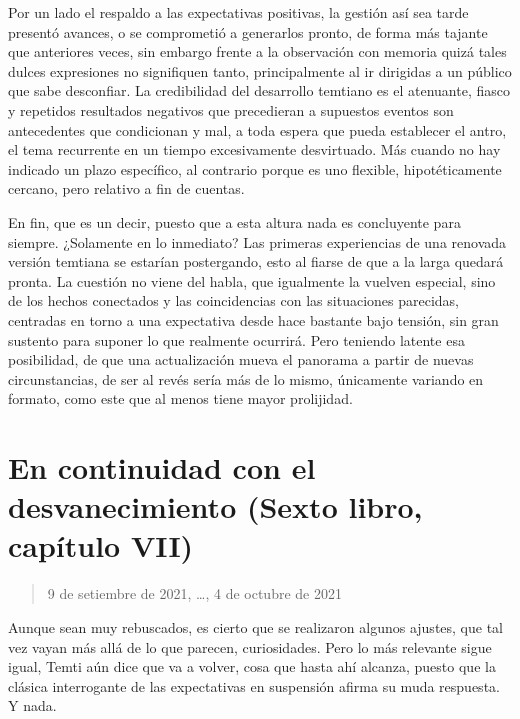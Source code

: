 \documentclass[
]{book}
\begin{document}
Por un lado el respaldo a las expectativas positivas, la gestión así sea tarde presentó avances, o se comprometió a generarlos pronto, de forma más tajante que anteriores veces, sin embargo frente a la observación con memoria quizá tales dulces expresiones no signifiquen tanto, principalmente al ir dirigidas a un público que sabe desconfiar. La credibilidad del desarrollo temtiano es el atenuante, fiasco y repetidos resultados negativos que precedieran a supuestos eventos son antecedentes que condicionan y mal, a toda espera que pueda establecer el antro, el tema recurrente en un tiempo excesivamente desvirtuado. Más cuando no hay indicado un plazo específico, al contrario porque es uno flexible, hipotéticamente cercano, pero relativo a fin de cuentas.

En fin, que es un decir, puesto que a esta altura nada es concluyente para siempre. ¿Solamente en lo inmediato? Las primeras experiencias de una renovada versión temtiana se estarían postergando, esto al fiarse de que a la larga quedará pronta. La cuestión no viene del habla, que igualmente la vuelven especial, sino de los hechos conectados y las coincidencias con las situaciones parecidas, centradas en torno a una expectativa desde hace bastante bajo tensión, sin gran sustento para suponer lo que realmente ocurrirá. Pero teniendo latente esa posibilidad, de que una actualización mueva el panorama a partir de nuevas circunstancias, de ser al revés sería más de lo mismo, únicamente variando en formato, como este que al menos tiene mayor prolijidad.

\hypertarget{en-continuidad-con-el-desvanecimiento-sexto-libro-capuxedtulo-vii}{%
\section{En continuidad con el desvanecimiento (Sexto libro, capítulo VII)}\label{en-continuidad-con-el-desvanecimiento-sexto-libro-capuxedtulo-vii}}

\begin{quote}
9 de setiembre de 2021, \ldots, 4 de octubre de 2021
\end{quote}

Aunque sean muy rebuscados, es cierto que se realizaron algunos ajustes, que tal vez vayan más allá de lo que parecen, curiosidades. Pero lo más relevante sigue igual, Temti aún dice que va a volver, cosa que hasta ahí alcanza, puesto que la clásica interrogante de las expectativas en suspensión afirma su muda respuesta. Y nada.
\end{document}
